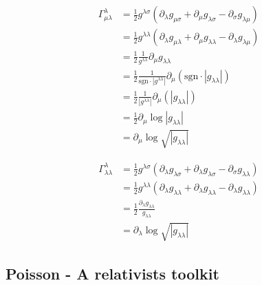 \documentclass[10pt,a4paper]{book}
\theoremstyle{definition}
\begin{document}
\begin{align}
\Gamma^\lambda_{\mu\lambda}
&=\frac{1}{2}g^{\lambda\sigma}(\partial_\lambda g_{\mu\sigma}+\partial_\mu g_{\lambda\sigma}-\partial_\sigma g_{\lambda\mu})\\
&=\frac{1}{2}g^{\lambda\lambda}(\partial_\lambda g_{\mu\lambda}+\partial_\mu g_{\lambda\lambda}-\partial_\lambda g_{\lambda\mu})\\
&=\frac{1}{2}\frac{1}{g^{\lambda\lambda}}\partial_\mu g_{\lambda\lambda}\\
&=\frac{1}{2}\frac{1}{\text{sgn}\cdot|g^{\lambda\lambda}|}\partial_\mu (\text{sgn}\cdot|g_{\lambda\lambda}|)\\
&=\frac{1}{2}\frac{1}{|g^{\lambda\lambda}|}\partial_\mu (|g_{\lambda\lambda}|)\\
&=\frac{1}{2}\partial_\mu \log|g_{\lambda\lambda}|\\
&=\partial_\mu \log\sqrt{|g_{\lambda\lambda}|}
\end{align}

\begin{align}
\Gamma^\lambda_{\lambda\lambda}
&=\frac{1}{2}g^{\lambda\sigma}(\partial_\lambda g_{\lambda\sigma}+\partial_\lambda g_{\lambda\sigma}-\partial_\sigma g_{\lambda\lambda})\\
&=\frac{1}{2}g^{\lambda\lambda}(\partial_\lambda g_{\lambda\lambda}+\partial_\lambda g_{\lambda\lambda}-\partial_\lambda g_{\lambda\lambda})\\
&=\frac{1}{2}\frac{\partial_\lambda g_{\lambda\lambda}}{g_{\lambda\lambda}}\\
&=\partial_\lambda \log \sqrt{|g_{\lambda\lambda}|}
\end{align}

\subsection{{\sc Poisson} - A relativists toolkit}
\end{document}
